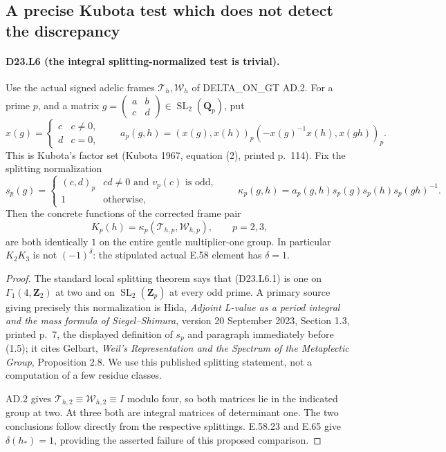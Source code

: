 \subsection{A precise Kubota test which does not detect the discrepancy}

\paragraph{D23.L6 (the integral splitting-normalized test is trivial).}
Use the actual signed adelic frames $\mathcal T_h,\mathcal W_h$
of DELTA\_ON\_GT AD.2.  For a prime $p$, and a matrix
$g=\left(\begin{smallmatrix}a&b\\c&d\end{smallmatrix}\right)
\in\operatorname{SL}_2(\mathbf Q_p)$, put
\[
 x(g)=\begin{cases}c&c\ne0,\\d&c=0,\end{cases}\qquad
 a_p(g,h)=(x(g),x(h))_p
             (-x(g)^{-1}x(h),x(gh))_p.
\]
This is Kubota's factor set (Kubota 1967, equation (2), printed
p.~114).  Fix the splitting normalization
\[
 s_p(g)=\begin{cases}
 (c,d)_p&cd\ne0\text{ and }v_p(c)\text{ is odd},\\
 1&\text{otherwise},
 \end{cases}
 \qquad
 \kappa_p(g,h)=a_p(g,h)s_p(g)s_p(h)s_p(gh)^{-1}.
\tag{D23.L6.1}
\]
Then the concrete functions of the corrected frame pair
\[
 K_p(h)=\kappa_p(\mathcal T_{h,p},\mathcal W_{h,p}),
 \qquad p=2,3,
\]
are both identically $1$ on the entire gentle multiplier-one
group.  In particular $K_2K_3$ is not $(-1)^\delta$: the
stipulated actual E.58 element has $\delta=1$.

\begin{proof}
The standard local splitting theorem says that (D23.L6.1) is
one on $\Gamma_1(4,\mathbf Z_2)$ at two and on
$\operatorname{SL}_2(\mathbf Z_p)$ at every odd prime.
A primary source giving precisely this normalization is Hida,
\emph{Adjoint L-value as a period integral and the mass formula
of Siegel--Shimura}, version 20 September 2023, Section 1.3,
printed p.~7, the displayed definition of $s_p$ and paragraph
immediately before (1.5); it cites Gelbart, \emph{Weil's
Representation and the Spectrum of the Metaplectic Group},
Proposition 2.8.  We use this published splitting statement,
not a computation of a few residue classes.

AD.2 gives $\mathcal T_{h,2}\equiv\mathcal W_{h,2}\equiv I$
modulo four, so both matrices lie in the indicated group at
two.  At three both are integral matrices of determinant one.
The two conclusions follow directly from the respective
splittings.  E.58.23 and E.65 give $\delta(h_*)=1$, providing
the asserted failure of this proposed comparison.
\end{proof}

